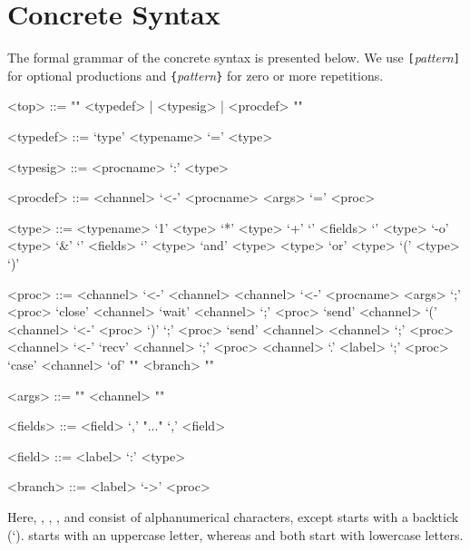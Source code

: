 
\chapter{Concrete Syntax}
\label{concrete-syntax}

The formal grammar of the concrete syntax is presented below. We use \texttt{[}\textit{pattern}\texttt{]} for optional productions and \texttt{\{}\textit{pattern}\texttt{\}} for zero or more repetitions.


\begin{grammar}
  <top> ::= "{" <typedef> | <typesig> | <procdef> "}"

  <typedef> ::= `type' <typename> `=' <type>

  <typesig> ::= <procname> `:' <type>

  <procdef> ::= <channel> `<-' <procname> <args> `=' <proc>


  <type> ::= <typename>
         \alt `1'
         \alt <type> `*' <type>
         \alt `+' `{' <fields> `}'
         \alt <type> `-o' <type>
         \alt `&' `{' <fields> `}'
         \alt <type> `and' <type>
         \alt <type> `or' <type>
         \alt `(' <type> `)'

  <proc> ::= <channel> `<-' <channel>
         \alt <channel> `<-' <procname> <args> `;' <proc>
         \alt `close' <channel>
         \alt `wait' <channel> `;' <proc>
         \alt `send' <channel> `(' <channel> `<-' <proc> `)' `;' <proc>
         \alt `send' <channel> <channel> `;' <proc>
         \alt <channel> `<-' `recv' <channel> `;' <proc>
         \alt <channel> `.' <label> `;' <proc>
         \alt `case' <channel> `of' "{" <branch> "}"


  <args> ::= "{" <channel> "}"

  <fields> ::= <field> `,' "..." `,' <field>

  <field> ::= <label> `:' <type>

  <branch> ::= <label> `->' <proc>
\end{grammar}

Here, , , , and  consist of alphanumerical characters, except  starts with a backtick (`).  starts with an uppercase letter, whereas  and  both start with lowercase letters.

